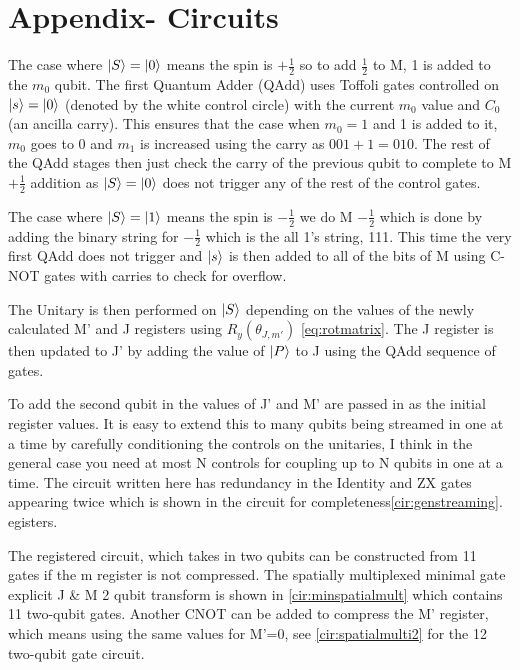 \appendix
\section{Appendix- Circuits}
\vspace{-1cm}

The case where $\left\vert{S}\right\rangle = \left\vert{0}\right\rangle$ means the spin is $+\frac{1}{2}$ so to add $\frac{1}{2}$ to M, 1 is added to the $m_0$ qubit. The first Quantum Adder (QAdd) uses Toffoli gates controlled on $\left\vert{s}\right\rangle=\left\vert{0}\right\rangle$ (denoted by the white control circle) with the current $m_0$ value and $C_0$ (an ancilla carry). This ensures that the case when $m_0 = 1$ and 1 is added to it, $m_0$ goes to 0 and $m_1$ is increased using the carry as $001+1=010$. The rest of the QAdd stages then just check the carry of the previous qubit to complete to M $+ \frac{1}{2}$ addition as $\left\vert{S}\right\rangle = \left\vert{0}\right\rangle$ does not trigger any of the rest of the control gates.

The case where $\left\vert{S}\right\rangle = \left\vert{1}\right\rangle$ means the spin is $-\frac{1}{2}$ we do M $-\frac{1}{2}$ which is done by adding the binary string for $-\frac{1}{2}$ which is the all 1's string, 111. This time the very first QAdd does not trigger and $\left\vert{s}\right\rangle$ is then added to all of the bits of M using C-NOT gates with carries to check for overflow. 

The Unitary is then performed on $\left\vert{S}\right\rangle$ depending on the values of the newly calculated M' and J registers using $R_y(\theta_{J,m'})$ \autoref{eq:rotmatrix}. The J register is then updated to J' by adding the value of $\left\vert{P}\right\rangle$ to J using the QAdd sequence of gates.

To add the second qubit in the values of J' and M' are passed in as the initial register values. It is easy to extend this to many qubits being streamed in one at a time by carefully conditioning the controls on the unitaries, I think in the general case you need at most N controls for coupling up to N qubits in one at a time. The circuit written here has redundancy in the Identity and ZX gates appearing twice which is shown in the circuit for completeness\autoref{cir:genstreaming}. 
egisters.

The registered circuit, which takes in two qubits can be constructed from 11 gates if the m register is not compressed. The spatially multiplexed minimal gate explicit J \& M 2 qubit transform is shown in \autoref{cir:minspatialmult} which contains 11 two-qubit gates.
Another CNOT can be added to compress the M' register, which means using the same values for M'=0, see \autoref{cir:spatialmulti2} for the 12 two-qubit gate circuit.



